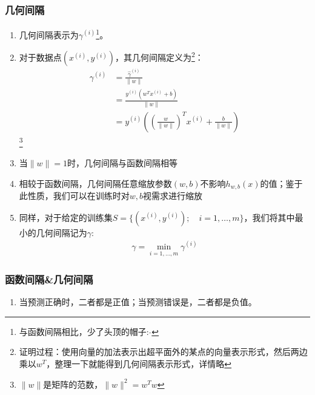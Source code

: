 \subsubsection{几何间隔}
\begin{enumerate}
	\item 几何间隔表示为$\gamma^{(i)}$\footnote{与函数间隔相比，少了头顶的帽子: $\hat{ }$}。
	\item 对于数据点$(x^{(i)}, y^{(i)})$，其几何间隔定义为\footnote{证明过程：使用向量的加法表示出超平面外的某点的向量表示形式，然后两边乘以$w^T$，整理一下就能得到几何间隔表示形式，详情略}：
	\begin{align}
		\gamma^{(i)} &= \frac{\hat{\gamma}^{(i)}}{\|w\|}  \\
		&= \frac{y^{(i)}(w^Tx^{(i)} + b)}{\|w\|}  \\
		&=  y^{(i)} \left(\left(\frac{w}{\|w\|}\right)^T x^{(i)} + \frac{b}{\|w\|}\right)
	\end{align}
	\footnote{$\|w\|$是矩阵的范数，$\|w\|^2=w^Tw$}
	\item 当$\|w\|=1$时，几何间隔与函数间隔相等
	\item 相较于函数间隔，几何间隔任意缩放参数$(w,b)$不影响$h_{w,b}(x)$的值；鉴于此性质，我们可以在训练时对$w, b$视需求进行缩放
	\item 同样，对于给定的训练集$S=\{(x^{(i)}, y^{(i)}); \quad i = 1, \dots, m\}$，我们将其中最小的几何间隔记为$\gamma$:
	\begin{align}
		\gamma = \min_{i=1,\dots,m}\gamma^{(i)}
	\end{align}
\end{enumerate}

\subsubsection{函数间隔\&几何间隔}
\begin{enumerate}
	\item 当预测正确时，二者都是正值；当预测错误是，二者都是负值。
\end{enumerate}

